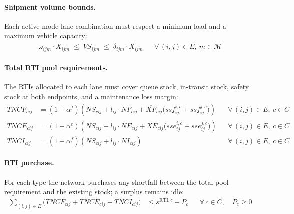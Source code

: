 \paragraph{Shipment volume bounds.}
Each active mode-lane combination must respect a minimum load and
a maximum vehicle capacity:
%
\begin{align}
  \omega_{ijm}\cdot\overline{X}_{ijm}
  \;\leq\; VS_{ijm}
  \;\leq\; \delta_{ijm}\cdot\overline{X}_{ijm}
  && \forall\,(i,j)\in E,\ m\in\mathcal{M}
  \label{eq:vol-bounds}
\end{align}


\paragraph{Total RTI pool requirements.}
The RTIs allocated to each lane must cover queue stock,
in-transit stock, safety stock at both endpoints, and a
maintenance loss margin:
%
\begin{align}
  TNCF_{cij}
  &= (1+\alpha^{f})\!\left(
       NS_{cij}
       + l_{ij}\cdot NF_{cij}
       + \overline{XF}_{cij}
         \bigl(ssf^{i,c}_{ij}+ssf^{j,c}_{ij}\bigr)
     \right)
  && \forall\,(i,j)\in E,\ c\in C
  \label{eq:pool-full}\\[4pt]
  TNCE_{cij}
  &= (1+\alpha^{e})\!\left(
       NS_{cij}
       + l_{ij}\cdot NE_{cij}
       + \overline{XE}_{cij}
         \bigl(sse^{i,c}_{ij}+sse^{j,c}_{ij}\bigr)
     \right)
  && \forall\,(i,j)\in E,\ c\in C
  \label{eq:pool-empty}\\[4pt]
  TNCI_{cij}
  &= (1+\alpha^{f})\!\left(
       NS_{cij}
       + l_{ij}\cdot NI_{cij}
     \right)
  && \forall\,(i,j)\in E,\ c\in C
  \label{eq:pool-inlay}
\end{align}


\paragraph{RTI purchase.}
For each type the network purchases any shortfall between the total
pool requirement and the existing stock; a surplus remains idle:
%
\begin{align}
  \sum_{(i,j)\in E}\!\bigl(
    TNCF_{cij}+TNCE_{cij}+TNCI_{cij}
  \bigr)
  &\leq s^{\text{RTI},c} + P_{c}
  && \forall\, c\in C,\quad P_{c}\geq 0
  \label{eq:purchase}
\end{align}

